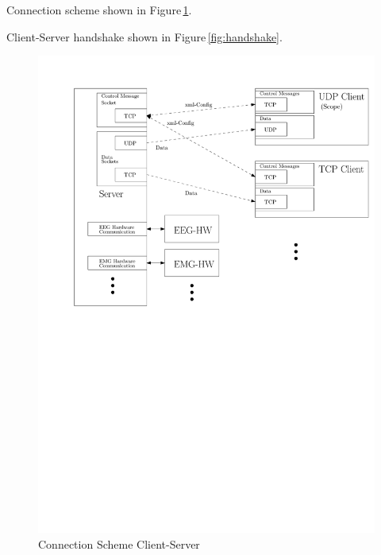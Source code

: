 \documentclass[11pt]{scrartcl}
\begin{document}
  Connection scheme shown in Figure\,\ref{fig:client-server}.


  Client-Server handshake shown in Figure\,\ref{fig:handshake}.

    \begin{figure}[htb]
      \centering
        \includegraphics[scale=0.7]{Client-Server.pdf}
      \caption{Connection Scheme Client-Server}
      \label{fig:client-server}
    \end{figure}
\end{document}
